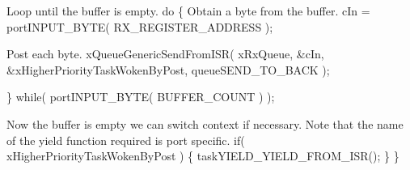 \begin{DoxyPre}Loop until the buffer is empty.
        do
        \{
Obtain a byte from the buffer.
                cIn = portINPUT\_BYTE( RX\_REGISTER\_ADDRESS );\end{DoxyPre}



\begin{DoxyPre}Post each byte.
                xQueueGenericSendFromISR( xRxQueue, &cIn, &xHigherPriorityTaskWokenByPost, queueSEND\_TO\_BACK );\end{DoxyPre}



\begin{DoxyPre}        \} while( portINPUT\_BYTE( BUFFER\_COUNT ) );\end{DoxyPre}



\begin{DoxyPre}Now the buffer is empty we can switch context if necessary.  Note that the
name of the yield function required is port specific.
        if( xHigherPriorityTaskWokenByPost )
        \{
                taskYIELD\_YIELD\_FROM\_ISR();
        \}
 \}
 \end{DoxyPre}
 